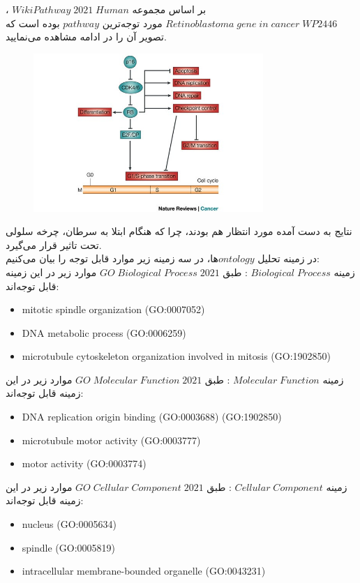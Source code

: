 \documentclass[a4paper,12pt]{article}
\begin{document}
بر اساس مجموعه
$WikiPathway\; 2021\; Human$
،
$Retinoblastoma\;gene\; in\; cancer\; WP2446$
مورد توجه‌ترین $pathway$ بوده است
که تصویر آن را در ادامه مشاهده می‌نمایید.
\begin{figure}[H]
 \centering
  \includegraphics[width=0.8\linewidth , height=6cm]{../../source/cancer.jpg}
\end{figure}
نتایج به دست آمده مورد انتظار هم بودند، چرا که هنگام ابتلا به سرطان، چرخه سلولی تحت تاثیر قرار می‌گیرد.\\
در زمینه تحلیل $ontology$ها، در سه زمینه زیر موارد قابل توجه را بیان می‌کنیم:\\
زمینه
$Biological\; Process$ : 
طبق
$GO\; Biological\; Process\; 2021$
موارد زیر در این زمینه قابل توجه‌اند:
\begin{latin}
\begin{itemize}
\item mitotic spindle organization (GO:0007052)
\item DNA metabolic process (GO:0006259)
\item microtubule cytoskeleton organization involved in mitosis (GO:1902850)
\end{itemize}
\end{latin}
زمینه
$Molecular\; Function$ : 
طبق
$GO\; Molecular\; Function\; 2021$
موارد زیر در این زمینه قابل توجه‌اند:
\begin{latin}
\begin{itemize}
\item DNA replication origin binding (GO:0003688) (GO:1902850)
\item microtubule motor activity (GO:0003777)
\item motor activity (GO:0003774)
\end{itemize}
\end{latin}
زمینه
$Cellular\; Component$ : 
طبق
$GO\; Cellular\; Component\; 2021$
موارد زیر در این زمینه قابل توجه‌اند:
\begin{latin}
\begin{itemize}
\item nucleus (GO:0005634)
\item spindle (GO:0005819)
\item intracellular membrane-bounded organelle (GO:0043231)
\end{itemize}
\end{latin}
\end{document}
